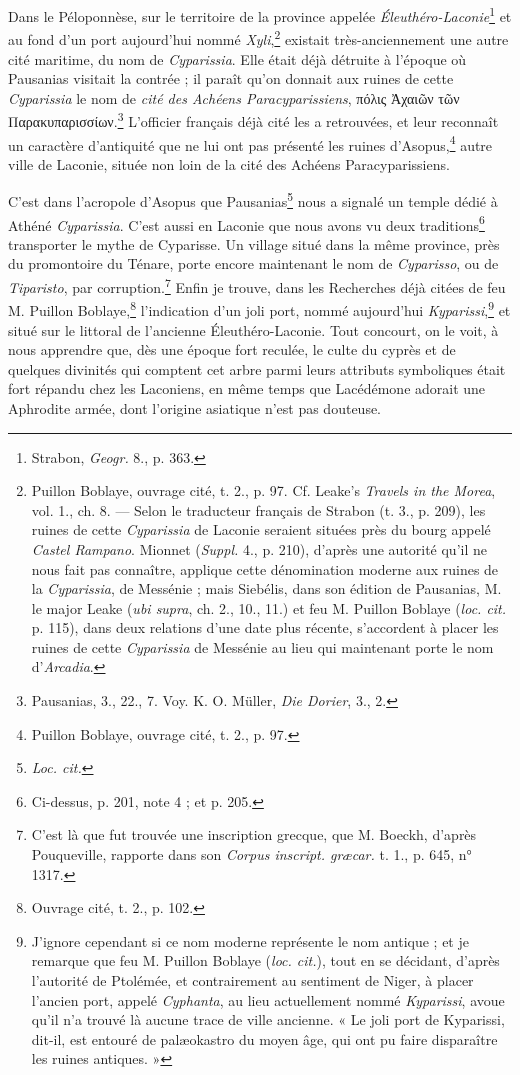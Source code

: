 \documentclass{article}
\begin{document}
Dans le Péloponnèse, sur le territoire de la province appelée \emph{Éleuthéro-Laconie}\footnote{Strabon, \emph{Geogr.} 8., p. 363.} et au fond d'un port aujourd'hui nommé \emph{Xyli},\footnote{Puillon Boblaye, ouvrage cité, t. 2., p. 97. Cf. Leake's \emph{Travels in the Morea}, vol. 1., ch. 8. --- Selon le traducteur français de Strabon (t. 3., p. 209), les ruines de cette \emph{Cyparissia} de Laconie seraient situées près du bourg appelé \emph{Castel Rampano}. Mionnet (\emph{Suppl.} 4., p. 210), d'après une autorité qu'il ne nous fait pas connaître, applique cette dénomination moderne aux ruines de la \emph{Cyparissia}, de Messénie ; mais Siebélis, dans son édition de Pausanias, M. le major Leake (\emph{ubi supra}, ch. 2., 10., 11.) et feu M. Puillon Boblaye (\emph{loc. cit.} p. 115), dans deux relations d'une date plus récente, s'accordent à placer les ruines de cette \emph{Cyparissia} de Messénie au lieu qui maintenant porte le nom d'\emph{Arcadia}.} existait très-anciennement une autre cité maritime, du nom de \emph{Cyparissia}. Elle était déjà détruite à l'époque où Pausanias visitait la contrée ; il paraît qu'on donnait aux ruines de cette \emph{Cyparissia} le nom de \emph{cité des Achéens Paracyparissiens}, \textgreek{πόλις Ἀχαιῶν τῶν Παρακυπαρισσίων}.\footnote{Pausanias, 3., 22., 7. Voy. K. O. Müller, \emph{Die Dorier}, 3., 2.} L'officier français déjà cité les a retrouvées, et leur reconnaît un caractère d'antiquité que ne lui ont pas présenté les ruines d'Asopus,\footnote{Puillon Boblaye, ouvrage cité, t. 2., p. 97.} autre ville de Laconie, située non loin de la cité des Achéens Paracyparissiens.

C'est dans l'acropole d'Asopus que Pausanias\footnote{\emph{Loc. cit.}} nous a signalé un temple dédié à Athéné \emph{Cyparissia}. C'est aussi en Laconie que nous avons vu deux traditions\footnote{Ci-dessus, p. 201, note 4 ; et p. 205.} transporter le mythe de Cyparisse. Un village situé dans la même province, près du promontoire du Ténare, porte encore maintenant le nom de \emph{Cyparisso}, ou de \emph{Tiparisto}, par corruption.\footnote{C'est là que fut trouvée une inscription grecque, que M. Boeckh, d'après Pouqueville, rapporte dans son \emph{Corpus inscript. græcar.} t. 1., p. 645, n° 1317.} Enfin je trouve, dans les Recherches déjà citées de feu M. Puillon Boblaye,\footnote{Ouvrage cité, t. 2., p. 102.} l'indication d'un joli port, nommé aujourd'hui \emph{Kyparissi},\footnote{J'ignore cependant si ce nom moderne représente le nom antique ; et je remarque que feu M. Puillon Boblaye (\emph{loc. cit.}), tout en se décidant, d'après l'autorité de Ptolémée, et contrairement au sentiment de Niger, à placer l'ancien port, appelé \emph{Cyphanta}, au lieu actuellement nommé \emph{Kyparissi}, avoue qu'il n'a trouvé là aucune trace de ville ancienne. « Le joli port de Kyparissi, dit-il, est entouré de palæokastro du moyen âge, qui ont pu faire disparaître les ruines antiques. »} et situé sur le littoral de l'ancienne Éleuthéro-Laconie. Tout concourt, on le voit, à nous apprendre que, dès une époque fort reculée, le culte du cyprès et de quelques divinités qui comptent cet arbre parmi leurs attributs symboliques était fort répandu chez les Laconiens, en même temps que Lacédémone adorait une Aphrodite armée, dont l'origine asiatique n'est pas douteuse.
\end{document}
